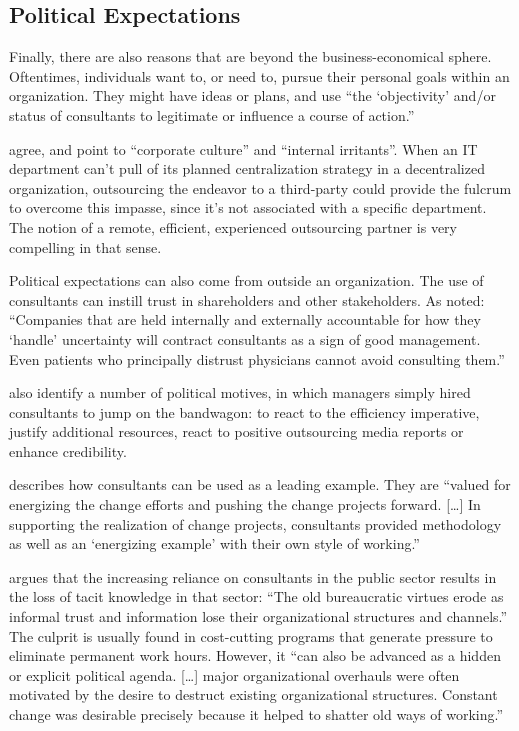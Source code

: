 \documentclass[12pt]{article}
\begin{document}
\subsection{Political Expectations}\label{political-expectations}

Finally, there are also reasons that are beyond the business-economical
sphere. Oftentimes, individuals want to, or need to, pursue their
personal goals within an organization. They might have ideas or plans,
and use ``the `objectivity' and/or status of consultants to legitimate
or influence a course of action.'' \citep[ 233]{sturdy1998}

\citet[14]{mcfarlan1995} agree, and point to ``corporate culture'' and
``internal irritants''. When an IT department can't pull of its planned
centralization strategy in a decentralized organization, outsourcing the
endeavor to a third-party could provide the fulcrum to overcome this
impasse, since it's not associated with a specific department. The
notion of a remote, efficient, experienced outsourcing partner is very
compelling in that sense.

Political expectations can also come from outside an organization. The
use of consultants can instill trust in shareholders and other
stakeholders. As \citet[70]{kieser2006} noted: ``Companies that are held
internally and externally accountable for how they `handle' uncertainty
will contract consultants as a sign of good management. Even patients
who principally distrust physicians cannot avoid consulting them.''

\citet[258]{lacity1993} also identify a number of political motives, in
which managers simply hired consultants to jump on the bandwagon: to
react to the efficiency imperative, justify additional resources, react
to positive outsourcing media reports or enhance credibility.

\citet[54]{werr2002} describes how consultants can be used as a leading
example. They are ``valued for energizing the change efforts and pushing
the change projects forward. {[}\ldots{]} In supporting the realization
of change projects, consultants provided methodology as well as an
`energizing example' with their own style of working.''

\citet[250]{ylonen2019} argues that the increasing reliance on
consultants in the public sector results in the loss of tacit knowledge
in that sector: ``The old bureaucratic virtues erode as informal trust
and information lose their organizational structures and channels.'' The
culprit is usually found in cost-cutting programs that generate pressure
to eliminate permanent work hours. However, it ``can also be advanced as
a hidden or explicit political agenda. {[}\ldots{]} major organizational
overhauls were often motivated by the desire to destruct existing
organizational structures. Constant change was desirable precisely
because it helped to shatter old ways of working.''
\end{document}
